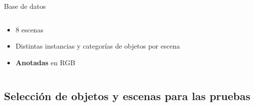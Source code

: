 \documentclass[]{beamer}
\begin{document}
\begin{frame}{Base de datos}
\begin{columns}[t]
\begin{column}{5cm}
            \begin{itemize}
                \item 8 escenas
                \item Distintas instancias y categorías de objetos por escena
                \item \alert{\textbf{Anotadas}} en RGB
            \end{itemize}

        \end{column}
    \end{columns}
\end{frame}

\subsection{Selección de objetos y escenas para las pruebas}
\end{document}
